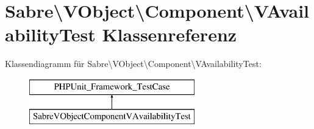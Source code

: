 \hypertarget{class_sabre_1_1_v_object_1_1_component_1_1_v_availability_test}{}\section{Sabre\textbackslash{}V\+Object\textbackslash{}Component\textbackslash{}V\+Availability\+Test Klassenreferenz}
\label{class_sabre_1_1_v_object_1_1_component_1_1_v_availability_test}
Klassendiagramm für Sabre\textbackslash{}V\+Object\textbackslash{}Component\textbackslash{}V\+Availability\+Test\+:\begin{figure}[H]
\begin{center}
\leavevmode
\includegraphics[height=2.000000cm]{class_sabre_1_1_v_object_1_1_component_1_1_v_availability_test}
\end{center}
\end{figure}
